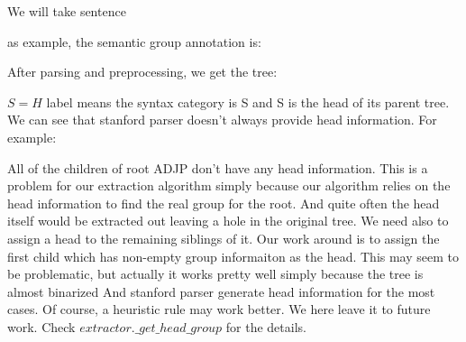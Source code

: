\documentclass[a4paper]{article}
\begin{document}
We will take sentence


as example, the semantic group annotation is:

After parsing and preprocessing, we get the tree:

\begin{center}
\end{center}

$S=H$ label means the syntax category is S and S is the head of its parent tree. We can see that stanford parser doesn't always provide head information. For example:
\begin{center}
\end{center}
All of the children of root ADJP don't have any head information. This is a problem for our extraction algorithm simply because our algorithm relies on the head information to find the real group for the root. And quite often the head itself would be extracted out leaving a hole in the original tree. We need also to assign a head to the remaining siblings of it. Our work around is to assign the first child which has non-empty group informaiton as the head. This may seem to be problematic, but actually it works pretty well simply because the tree is almost binarized And stanford parser generate head information for the most cases. Of course, a heuristic rule may work better. We here leave it to future work. Check $extractor.\_get\_head\_group$ for the details.
\end{document}
